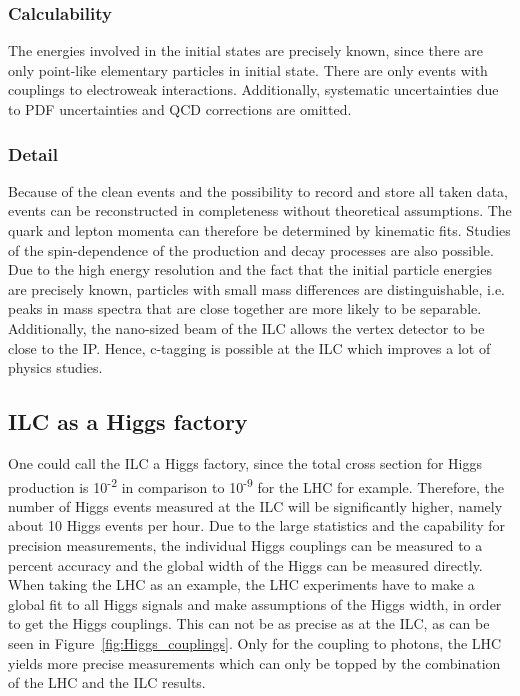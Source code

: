 \subsubsection{Calculability}
The energies involved in the initial states are precisely known, since there are only point-like elementary particles in initial state.
There are only events with couplings to electroweak interactions.
Additionally, systematic uncertainties due to PDF uncertainties and QCD corrections are omitted.
\subsubsection{Detail}
Because of the clean events and the possibility to record and store all taken data, events can be reconstructed in completeness without theoretical assumptions.
The quark and lepton momenta can therefore be determined by kinematic fits.
Studies of the spin-dependence of the production and decay processes are also possible.\\
Due to the high energy resolution and the fact that the initial particle energies are precisely known, particles with small mass differences are distinguishable, i.e. peaks in mass spectra that are close together are more likely to be separable.\\
Additionally, the nano-sized beam of the ILC allows the vertex detector to be close to the IP. 
Hence, c-tagging is possible at the ILC which improves a lot of physics studies.

\subsection{ILC as a Higgs factory}
One could call the ILC a Higgs factory, since the total cross section for Higgs production is 10\textsuperscript{-2} in comparison to 10\textsuperscript{-9} for the LHC for example.
Therefore, the number of Higgs events measured at the ILC will be significantly higher, namely about 10 Higgs events per hour.
Due to the large statistics and the capability for precision measurements, the individual Higgs couplings can be measured to a percent accuracy and the global width of the Higgs can be measured directly.
When taking the LHC as an example, the LHC experiments have to make a global fit to all Higgs signals and make assumptions of the Higgs width, in order to get the Higgs couplings.
This can not be as precise as at the ILC, as can be seen in Figure~\ref{fig:Higgs_couplings}.
Only for the coupling to photons, the LHC yields more precise measurements which can only be topped by the combination of the LHC and the ILC results.

